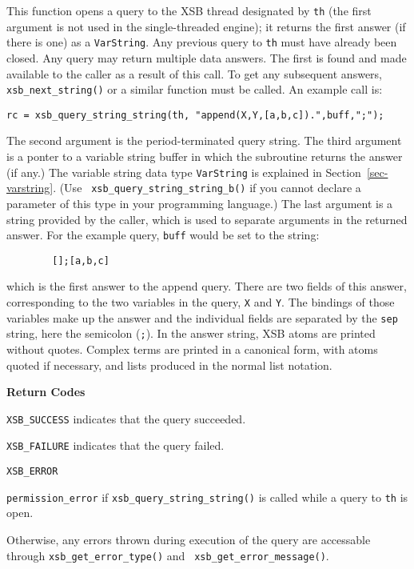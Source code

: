 \begin{description}
  
%
This function opens a query to the XSB thread designated by {\tt th}
(the first argument is not used in the single-threaded engine); it
returns the first answer (if there is one) as a {\tt VarString}.  Any
previous query to {\tt th} must have already been closed.  Any query
may return multiple data answers.  The first is found and made
available to the caller as a result of this call.  To get any
subsequent answers, {\tt xsb\_next\_string()} or a similar function
must be called.  An example call is:
\begin{verbatim}
rc = xsb_query_string_string(th, "append(X,Y,[a,b,c]).",buff,";");
\end{verbatim}
The second argument is the period-terminated query string.  The third
argument is a ponter to a variable string buffer in which the
subroutine returns the answer (if any.) The variable string data type
{\tt VarString} is explained in Section~\ref{sec-varstring}. (Use {\tt
  xsb\_query\_string\_string\_b()} if you cannot declare a parameter
of this type in your programming language.)  The last argument is a
string provided by the caller, which is used to separate arguments in
the returned answer.  For the example query, {\tt buff} would be set
to the string:
\begin{verbatim}
        [];[a,b,c]
\end{verbatim}
which is the first answer to the append query.  There are two fields
of this answer, corresponding to the two variables in the query,
\verb|X| and \verb|Y|.  The bindings of those variables make up the
answer and the individual fields are separated by the \verb|sep|
string, here the semicolon (\verb|;|).  In the answer string, XSB
atoms are printed without quotes.  Complex terms are printed in a
canonical form, with atoms quoted if necessary, and lists produced in
the normal list notation.

{\bf Return Codes}  
\bi
\item {\tt XSB\_SUCCESS} indicates that the query succeeded.
%
\item {\tt XSB\_FAILURE} indicates that the query failed.
%
\item {\tt XSB\_ERROR} 
\bi
\item {\tt permission\_error} if {\tt xsb\_query\_string\_string()} is
  called while a query to {\tt th} is open.
%
\item Otherwise, any errors thrown during execution of the query are
  accessable through {\tt xsb\_get\_error\_type()} and {\tt
    xsb\_get\_error\_message()}.  
\ei 
\ei


\end{description}
